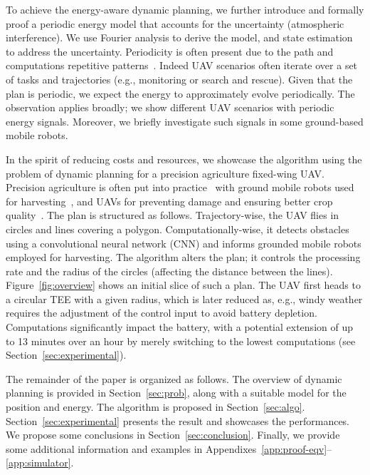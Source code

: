 \documentclass[letterpaper,10pt,conference]{ieeeconf}
\theoremstyle{definition}
\begin{document}
To achieve the energy-aware dynamic planning, we further introduce and formally proof a periodic energy model that accounts for the uncertainty (atmospheric interference). We use Fourier analysis to derive the model, and state estimation to address the uncertainty. Periodicity is often present due to the path and computations repetitive patterns~\cite{seewald2020mechanical}. Indeed UAV scenarios often iterate over a set of tasks and trajectories (e.g., monitoring or search and rescue). Given that the plan is periodic, we expect the energy to approximately evolve periodically. 
The observation applies broadly; we show different UAV scenarios with periodic energy signals. Moreover, we briefly investigate such signals in some ground-based mobile robots.

In the spirit of reducing costs and resources, we showcase the algorithm using the problem of dynamic planning for a precision agriculture fixed-wing UAV. Precision agriculture is often put into practice~\cite{hajjaj2014review} with ground mobile robots used for harvesting~\cite{qingchun2012study,dong2011development, de2011design, aljanobi2010setup, li2008analysis, edan2000robotic}, and UAVs for preventing damage and ensuring better crop quality~\cite{puri2017agriculture, daponte2019review}. The plan is structured as follows. Trajectory-wise, the UAV flies in circles and lines covering a polygon. Computationally-wise, it detects obstacles using a convolutional neural network (CNN) and informs grounded mobile robots employed for harvesting. The algorithm alters the plan; it controls the processing rate and the radius of the circles (affecting the distance between the lines). Figure~\ref{fig:overview} shows an initial slice of such a plan. The UAV first heads to a circular TEE with a given radius, which is later reduced as, e.g., windy weather requires the adjustment of the control input to avoid battery depletion. Computations significantly impact the battery, with a potential extension of up to 13 minutes over an hour by merely switching to the lowest computations (see Section~\ref{sec:experimental}).

The remainder of the paper is organized as follows. The overview of dynamic planning is provided in Section~\ref{sec:prob}, along with a suitable model for the position and energy. The algorithm is proposed in Section~\ref{sec:algo}. Section~\ref{sec:experimental} presents the result and showcases the performances. We propose some conclusions in Section~\ref{sec:conclusion}. Finally, we provide some additional information and examples in Appendixes~\ref{app:proof-eqv}--\ref{app:simulator}.
\end{document}
